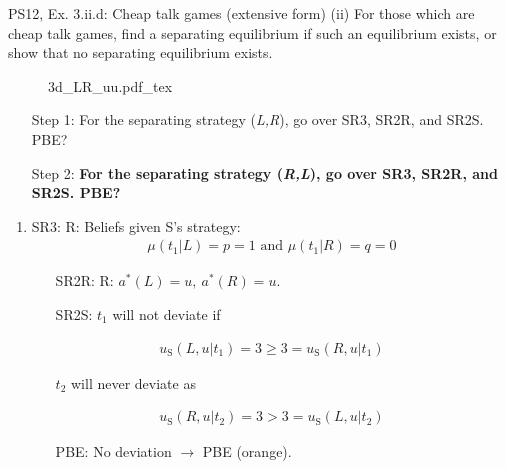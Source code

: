 \begin{frame}{PS12, Ex. 3.ii.d: Cheap talk games (extensive form)}
    (ii) For those which are cheap talk games, find a separating equilibrium if such an equilibrium exists, or show that no separating equilibrium exists.\vspace{-6pt}
    \begin{multicols}{2}
      \begin{figure}[!h]
        \center{}
        {3d_LR_uu.pdf_tex}
      \end{figure}\vspace{-6pt}
      \begin{itemize}
        \item[Step 1:] For the separating strategy (\textit{L,R}), go over SR3, SR2R, and SR2S. PBE?
        \item[Step 2:] \textbf{For the separating strategy (\textit{R,L}), go over SR3, SR2R, and SR2S. PBE?}
      \end{itemize}
      \vfill\null\columnbreak
      \begin{enumerate}
        \item SR3: R: Beliefs given S's strategy:\vspace{-8pt}
        \begin{align*}
          \mu(t_1|L)=p=1\text{ and }\mu(t_1|R)=q=0
        \end{align*}\vspace{-18pt}
        \begin{itemize}\normalsize
          \item[SR2R:] R: $a^*(L)=u,\ a^*(R)=u$.
          \item[SR2S:] $t_1$ will not deviate if
        \end{itemize}\vspace{-10pt}
        \begin{align*}
          u_\text{S}(L,u|t_1)=3\geq 3=u_\text{S}(R,u|t_1)
        \end{align*}\vspace{-18pt}
        \begin{itemize}\normalsize
          \item[] $t_2$ will never deviate as
        \end{itemize}\vspace{-10pt}
        \begin{align*}
          u_\text{S}(R,u|t_2)=3>3=u_\text{S}(L,u|t_2)
        \end{align*}\vspace{-18pt}
        \begin{itemize}\normalsize
          \item[PBE:] No deviation $\rightarrow$ PBE \textcolor{YellowOrange}{(orange)}.
        \end{itemize}
      \end{enumerate}
      \vfill\null
    \end{multicols}
\end{frame}
